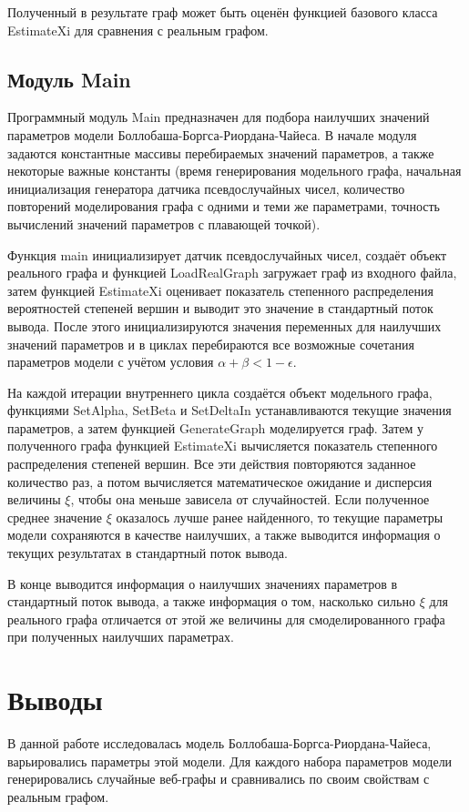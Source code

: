 \documentclass[14pt]{extreport}
\begin{document}
Полученный в результате граф может быть оценён функцией базового класса EstimateXi для сравнения с реальным графом.

\section{Модуль Main}

Программный модуль Main предназначен для подбора наилучших значений параметров модели Боллобаша-Боргса-Риордана-Чайеса. В начале модуля задаются константные массивы перебираемых значений параметров, а также некоторые важные константы (время генерирования модельного графа, начальная инициализация генератора датчика псевдослучайных чисел, количество повторений моделирования графа с одними и теми же параметрами, точность вычислений значений параметров с плавающей точкой).

Функция main инициализирует датчик псевдослучайных чисел, создаёт объект реального графа и функцией LoadRealGraph загружает граф из входного файла, затем функцией EstimateXi оценивает показатель степенного распределения вероятностей степеней вершин и выводит это значение в стандартный поток вывода. После этого инициализируются значения переменных для наилучших значений параметров и в циклах перебираются все возможные сочетания параметров модели с учётом условия $\alpha + \beta < 1 - \epsilon$.

На каждой итерации внутреннего цикла создаётся объект модельного графа, функциями SetAlpha, SetBeta и SetDeltaIn устанавливаются текущие значения параметров, а затем функцией GenerateGraph моделируется граф. Затем у полученного графа функцией EstimateXi вычисляется показатель степенного распределения степеней вершин. Все эти действия повторяются заданное количество раз, а потом вычисляется математическое ожидание и дисперсия величины $\xi$, чтобы она меньше зависела от случайностей. Если полученное среднее значение $\xi$ оказалось лучше ранее найденного, то текущие параметры модели сохраняются в качестве наилучших, а также выводится информация о текущих результатах в стандартный поток вывода.

В конце выводится информация о наилучших значениях параметров в стандартный поток вывода, а также информация о том, насколько сильно $\xi$ для реального графа отличается от этой же величины для смоделированного графа при полученных наилучших параметрах.

\chapter{Выводы}
В данной работе исследовалась модель Боллобаша-Боргса-Риордана-Чайеса, варьировались параметры этой модели. Для каждого набора параметров модели генерировались случайные веб-графы и сравнивались по своим свойствам с реальным графом.
\end{document}
